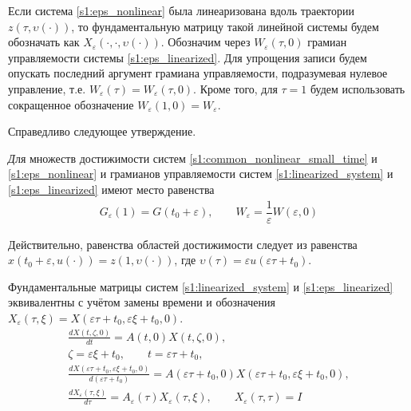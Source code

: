 \documentclass[../main.tex]{subfiles}
\begin{document}
Если система \eqref{s1:eps_nonlinear} была линеаризована вдоль траектории $ z(\tau, \upsilon(\cdot)) $, то фундаментальную матрицу такой линейной системы будем обозначать как $X_{\varepsilon}(\cdot,\cdot, \upsilon(\cdot)) $.
Обозначим через $ W_{\varepsilon}(\tau, 0) $ грамиан управляемости системы \eqref{s1:eps_linearized}. 
Для упрощения записи будем опускать последний аргумент грамиана управляемости, подразумевая нулевое управление, т.е. $W_{\varepsilon}(\tau) = W_{\varepsilon}(\tau, 0) $.
Кроме того, для $\tau = 1$ будем использовать сокращенное обозначение $W_{\varepsilon}(1, 0) = W_{\varepsilon}$. 

Справедливо следующее утверждение.

\begin{utv}\label{s1:utv:connection_with_scaled_system}
    {\textit Для множеств достижимости систем \eqref{s1:common_nonlinear_small_time} и \eqref{s1:eps_nonlinear} и грамианов управляемости систем \eqref{s1:linearized_system} и \eqref{s1:eps_linearized} имеют место равенства}
    \begin{gather*}
        G_{\varepsilon}(1) = G(t_0 + \varepsilon),  \qquad
        W_{\varepsilon} = \dfrac{1}{\varepsilon} W(\varepsilon, 0)
    \end{gather*}
\end{utv}

\doc 
Действительно, равенства областей достижимости следует из равенства $ x(t_0 + \varepsilon, u(\cdot)) = z(1, \upsilon(\cdot)) $, где  $ \upsilon(\tau) = \varepsilon u(\varepsilon \tau + t_0)  $.

Фундаментальные матрицы систем \eqref{s1:linearized_system} и \eqref{s1:eps_linearized} эквивалентны с учётом замены времени и обозначения $ X_{\varepsilon}(\tau,\xi) = X(\varepsilon \tau + t_0,\varepsilon \xi + t_0, 0) $.
\begin{gather*}
	\frac{dX(t,\zeta, 0)}{dt} = A(t, 0) X(t,\zeta, 0), \\
	\zeta = \varepsilon \xi + t_0, \qquad t = \varepsilon \tau + t_0, \\
	\frac{dX(\varepsilon \tau + t_0, \varepsilon \xi + t_0, 0)}{d(\varepsilon \tau + t_0)} = A(\varepsilon \tau + t_0, 0) X(\varepsilon \tau + t_0,\varepsilon \xi + t_0, 0), \\
	\frac{dX_{ \varepsilon}(\tau,\xi)}{d\tau} =  A_{\varepsilon}(\tau)  X_{ \varepsilon}(\tau,\xi), \qquad X_{\varepsilon}(\tau,\tau) = I
\end{gather*}
\end{document}
